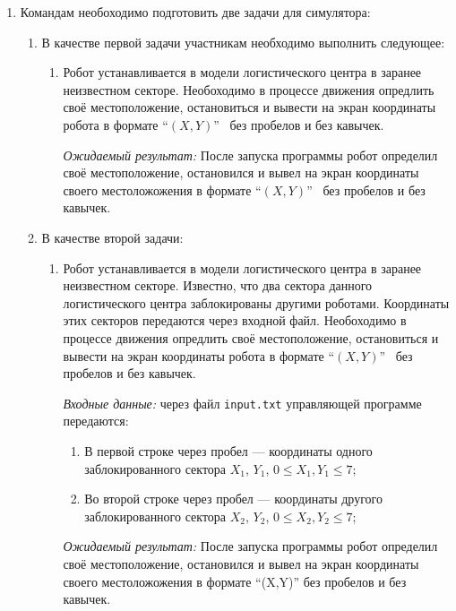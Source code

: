 
\begin{enumerate}
    \item Командам необоходимо подготовить две задачи для симулятора:
    \begin{enumerate}
        \item В качестве первой задачи участникам необходимо выполнить следующее:
        \begin{enumerate}
            \item Робот устанавливается в модели логистического центра в заранее неизвестном секторе.
                Необоходимо в процессе движения опредлить своё местоположение, остановиться и
                вывести на экран координаты робота в формате ``$(X,Y)$''~ без пробелов и без кавычек.

            \textit{Ожидаемый результат:} После запуска программы робот определил своё местоположение, остановился и
            вывел на экран координаты своего местоложожения в формате ``$(X,Y)$''~ без пробелов и без кавычек.
        \end{enumerate}
        \item В качестве второй задачи:
        \begin{enumerate}
            \item Робот устанавливается в модели логистического центра в заранее неизвестном секторе.
                Известно, что два сектора данного логистического центра заблокированы другими роботами.
                Координаты этих секторов передаются через входной файл.
                Необоходимо в процессе движения опредлить своё местоположение, остановиться и
                вывести на экран координаты робота в формате ``$(X,Y)$''~ без пробелов и без кавычек.

            \textit{Входные данные:} через файл \texttt{input.txt} управляющей программе передаются:
            \begin{enumerate}
                \item В первой строке через пробел --- координаты одного заблокированного сектора $X_{1}$, $Y_{1}$,
                    $0 \le X_{1}, Y_{1} \le 7$;
                \item Во второй строке через пробел --- координаты другого заблокированного сектора $X_{2}$, $Y_{2}$,
                    $0 \le X_{2}, Y_{2} \le 7$;
            \end{enumerate}

            \textit{Ожидаемый результат:} После запуска программы робот определил своё местоположение, остановился и
            вывел на экран координаты своего местоложожения в формате ``(X,Y)'' без пробелов и без кавычек.


\end{enumerate}
\end{enumerate}
\end{enumerate}
